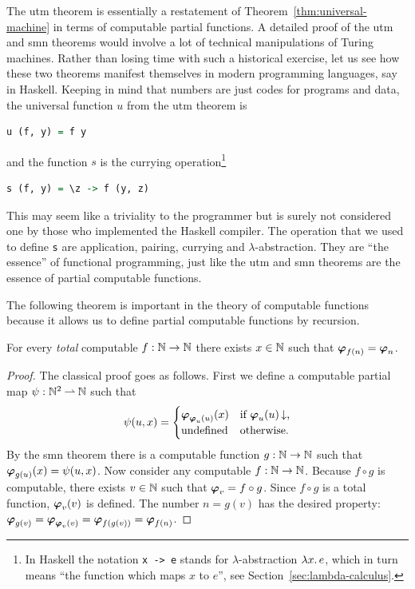 \noindent
The utm theorem is essentially a restatement of
Theorem~\ref{thm:universal-machine} in terms of computable partial
functions. A detailed proof of the utm and smn theorems would involve
a lot of technical manipulations of Turing machines. Rather than
losing time with such a historical exercise, let us see how these two
theorems manifest themselves in modern programming languages, say in
Haskell. Keeping in mind that numbers are just codes for programs and
data, the universal function $u$ from the utm theorem is
%
\begin{lstlisting}[language=Haskell]
u (f, y) = f y
\end{lstlisting}
%
and the function $s$ is the currying operation\footnote{In Haskell the
  notation \texttt{{}x -> e} stands for $\lambda$-abstraction
  $\lambda x .\,e$, which in turn means ``the function which maps $x$ to
  $e$'', see Section~\ref{sec:lambda-calculus}.}
%
\begin{lstlisting}[language=Haskell]
s (f, y) = \z -> f (y, z)
\end{lstlisting}
%
This may seem like a triviality to the programmer but is surely not
considered one by those who implemented the Haskell compiler. The
operation that we used to define \lstinline!s! are application,
pairing, currying and $\lambda$-abstraction. They are ``the essence''
of functional programming, just like the utm and smn theorems are the
essence of partial computable functions.

The following theorem is important in the theory of computable
functions because it allows us to define partial computable functions
by recursion.

\begin{theorem}
  For every \emph{total} computable $f : \mathbb{N} \to \mathbb{N}$ there exists $x
  \in \mathbb{N}$ such that $\text{\boldmath{$\varphi$}}_{f(n)} = \text{\boldmath{$\varphi$}}_{n}$.
\end{theorem}

\begin{proof}
  The classical proof goes as follows. First we define a computable
  partial map $\psi : \mathbb{N}^2 \mathbin{\rightharpoonup} \mathbb{N}$ such that
  \begin{equation*}
    \psi(u, x) =
    \begin{cases}
      \text{\boldmath{$\varphi$}}_{\text{\boldmath{$\varphi$}}_{u}(u)}(x) & \text{if $\text{\boldmath{$\varphi$}}_{u}(u)\,{\downarrow}$,}\\
      \text{undefined}  & \text{otherwise.}\\
    \end{cases}
  \end{equation*}
  By the smn theorem there is a computable function $g : \mathbb{N} \to \mathbb{N}$
  such that $\text{\boldmath{$\varphi$}}_{g(u)}(x) = \psi(u, x)$. Now consider any computable
  $f : \mathbb{N} \to \mathbb{N}$. Because $f \circ g$ is computable, there exists
  $v \in \mathbb{N}$ such that $\text{\boldmath{$\varphi$}}_{v} = f \circ g$. Since $f \circ g$ is a
  total function, $\text{\boldmath{$\varphi$}}_{v}(v)$ is defined. The number $n = g(v)$ has
  the desired property:
  $\text{\boldmath{$\varphi$}}_{g(v)} = \text{\boldmath{$\varphi$}}_{\text{\boldmath{$\varphi$}}_{v}(v)} = \text{\boldmath{$\varphi$}}_{f(g(v))} = \text{\boldmath{$\varphi$}}_{f(n)}$.
\end{proof}


